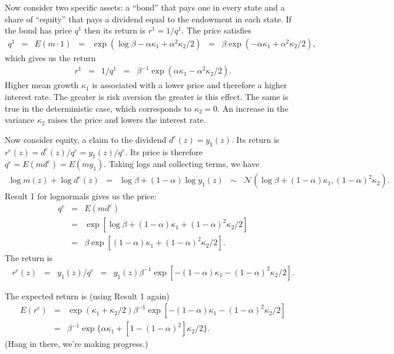 \documentclass[11pt]{article}
\begin{document}
Now consider two specific assets:  a ``bond'' that pays one in every state
and a share of ``equity'' that pays a dividend equal to the endowment in each state.
If the bond has price $q^1$ then its return is $r^1 = 1/q^1$.
The price satisfies
\begin{eqnarray*}
     q^1 &=& E(m \cdot 1) \;\;=\;\; \exp(\log \beta - \alpha \kappa_1 + \alpha^2 \kappa_2/2 )
            \;\;=\;\; \beta \exp(- \alpha \kappa_1 + \alpha^2 \kappa_2/2 ),
\end{eqnarray*}
which gives us the return
\begin{eqnarray*}
     r^1 &=& 1/q^1
            \;\;=\;\; \beta^{-1} \exp( \alpha \kappa_1 - \alpha^2 \kappa_2/2 ) .
\end{eqnarray*}
Higher mean growth $\kappa_1$ is associated with a lower price
and therefore a higher interest rate.
The greater is risk aversion the greater is this effect.
The same is true in the deterministic case,
which corresponds to $\kappa_2 = 0$.
An increase in the variance $\kappa_2$ raises the price and lowers the interest rate.

Now consider equity, a claim to the dividend $d^e(z) = y_1(z)$.
Its return is $r^e(z) = d^e(z)/q^e = y_1(z)/q^e$.
Its price is therefore $q^e = E( m d^e) = E( m y_1)$.
Taking logs and collecting terms, we have
\begin{eqnarray*}
    \log m(z) + \log d^e(z) &=& \log \beta  + (1-\alpha) \log y_1(z)
    \;\;\sim\;\; \mathcal{N}(\log \beta + (1-\alpha) \kappa_1, (1-\alpha)^2 \kappa_2).
\end{eqnarray*}
Result 1 for lognormals gives us the price:
\begin{eqnarray*}
    q^e &=& E \left( m d^e\right) \\
        &=& \exp[\log \beta + (1- \alpha) \kappa_1 + (1-\alpha)^2 \kappa_2/2 ] \\
        &=& \beta \exp[(1- \alpha) \kappa_1 + (1-\alpha)^2 \kappa_2/2 ] .
\end{eqnarray*}
The return is
\begin{eqnarray*}
    r^e(z) \;\;=\;\; y_1(z)/q^e &=&
        y_1(z) \beta^{-1} \exp[-(1- \alpha) \kappa_1 - (1-\alpha)^2 \kappa_2/2 ] .
\end{eqnarray*}

The expected return is (using Result 1 again)
\begin{eqnarray*}
    E(r^e)  &=&
    \exp(\kappa_1 + \kappa_2/2)  \beta^{-1}
            \exp[-(1- \alpha) \kappa_1 - (1-\alpha)^2 \kappa_2/2 ]  \\
    &=& \beta^{-1} \exp\{\alpha \kappa_1 + [1 - (1-\alpha)^2] \kappa_2/2 \} .
\end{eqnarray*}
(Hang in there, we're making progress.)
\end{document}
